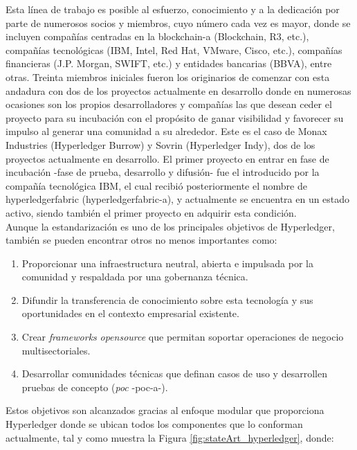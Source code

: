 \documentclass[12pt,a4paper, twoside]{report}
\begin{document}
	Esta línea de trabajo es posible al esfuerzo, conocimiento y a la dedicación por parte de numerosos socios y miembros, cuyo número cada vez es mayor, donde se incluyen compañías centradas en la \gls{blockchain-a} (Blockchain, R3, etc.), compañías tecnológicas (IBM, Intel, Red Hat, VMware, Cisco, etc.), compañías financieras (J.P. Morgan, SWIFT, etc.) y entidades bancarias (BBVA), entre otras. Treinta miembros iniciales fueron los originarios de comenzar con esta andadura con dos de los proyectos actualmente en desarrollo donde en numerosas ocasiones son los propios desarrolladores y compañías las que desean ceder el proyecto para su incubación con el propósito de ganar visibilidad y favorecer su impulso al generar una comunidad a su alrededor. Este es el caso de Monax Industries (Hyperledger Burrow) y Sovrin (Hyperledger Indy), dos de los proyectos actualmente en desarrollo. El primer proyecto en entrar en fase de incubación -fase de prueba, desarrollo y difusión- fue el introducido por la compañía tecnológica IBM, el cual recibió posteriormente el nombre de  \gls{hyperledgerfabric} (\gls{hyperledgerfabric-a}), y actualmente se encuentra en un estado activo, siendo también el primer proyecto en adquirir esta condición.	 \\
	
	Aunque la estandarización es uno de los principales objetivos de Hyperledger, también se pueden encontrar otros no menos importantes como:
	
	\begin{enumerate}
		\item Proporcionar una infraestructura neutral, abierta e impulsada por la comunidad y respaldada por una gobernanza técnica.
		\item Difundir la transferencia de conocimiento sobre esta tecnología y sus oportunidades en el contexto empresarial existente.
		\item Crear \textit{\glspl{framework}} \textit{\gls{opensource}} que permitan soportar operaciones de negocio multisectoriales.
		\item Desarrollar comunidades técnicas que definan casos de uso y desarrollen pruebas de concepto (\textit{\gls{poc}} -\gls{poc-a}-).	
	\end{enumerate}

	Estos objetivos son alcanzados gracias al enfoque modular que proporciona Hyperledger donde se ubican todos los componentes que lo conforman actualmente, tal y como muestra la Figura \ref{fig:stateArt_hyperledger}, donde:
	
\end{document}
